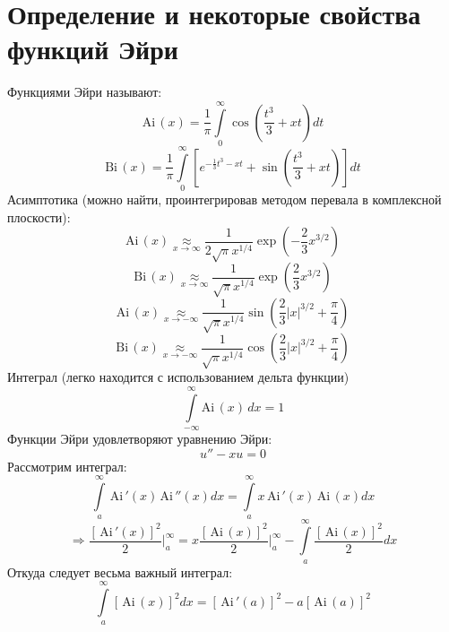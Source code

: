 \section{Определение и некоторые свойства функций Эйри}

Функциями Эйри называют:
\[
	\mathrm{Ai\,}(x) = \frac{1}{\pi} \int\limits_0^\infty \cos \left( \frac{t^3}{3} + xt\right) dt
\]
\[
	\mathrm{Bi\,}(x) = \frac{1}{\pi} \int\limits_0^\infty \left[e^{-\frac{1}{3}t^3 - xt} + \sin \left( \frac{t^3}{3} + xt\right)\right] dt
\]
Асимптотика (можно найти, проинтегрировав методом перевала в комплексной плоскости):
\[
	\mathrm{Ai\,}(x) \underset{x \to \infty}{\approx} \frac{1}{2\sqrt{\pi} x^{1/4}} \exp \left( -\frac{2}{3} x^{3/2}\right)
\]
\[
	\mathrm{Bi\,}(x) \underset{x \to \infty}{\approx} \frac{1}{\sqrt{\pi} x^{1/4}} \exp \left( \frac{2}{3} x^{3/2}\right)
\]
\[
	\mathrm{Ai\,}(x) \underset{x \to -\infty}{\approx} \frac{1}{\sqrt{\pi} x^{1/4}} \sin \left( \frac{2}{3} |x|^{3/2} + \frac{\pi}{4}\right)
\]
\[
	\mathrm{Bi\,}(x) \underset{x \to -\infty}{\approx} \frac{1}{\sqrt{\pi} x^{1/4}} \cos \left( \frac{2}{3} |x|^{3/2}+ \frac{\pi}{4}\right)
\]
Интеграл (легко находится с использованием дельта функции)
\[
	\int\limits_{-\infty}^{\infty} \mathrm{Ai\,}(x)\, dx = 1
\]
Функции Эйри удовлетворяют уравнению Эйри:
\[
	u'' - xu = 0
\]
Рассмотрим интеграл:
\[
	\int\limits_{a}^{\infty}\mathrm{\,Ai\,}'(x) \mathrm{\,Ai\,}''(x) dx= 
	\int\limits_{a}^{\infty} x \mathrm{\,Ai\,}'(x) \mathrm{\,Ai\,}(x) dx
\]
\[
	\Rightarrow \frac{\left[\mathrm{\,Ai\,}'(x) \right]^2}{2} \Bigg|_{a}^{\infty} =
	x \frac{\left[\mathrm{\,Ai\,}(x) \right]^2}{2} \Bigg|_{a}^{\infty} - 
	\int\limits_{a}^{\infty} \frac{\left[\mathrm{\,Ai\,}(x) \right]^2}{2} dx
\]
Откуда следует весьма важный интеграл:
\[
	\int\limits_{a}^{\infty} \left[\mathrm{\,Ai\,}(x) \right]^2 dx =
	\left[\mathrm{\,Ai\,}'(a) \right]^2  - a \left[\mathrm{\,Ai\,}(a) \right]^2
\]
